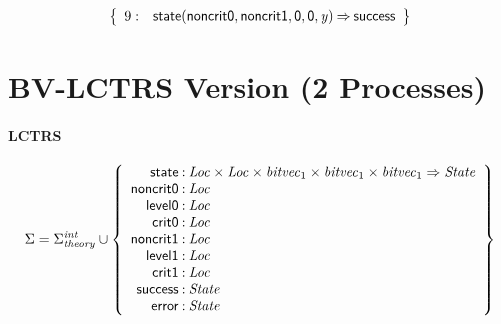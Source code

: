 \documentclass[a4paper]{article}
\newcommand{\Sort}[1]{\mathit{#1}}
\newcommand{\symb}[1]{\mathsf{#1}}
\newcommand{\var}[1]{\mathit{#1}}
\newcommand{\Sigmainttheory}{\Sigma^{\mathit{int}}_{\mathit{theory}}}
\begin{document}
\[
\left\{
\begin{array}{rr@{\>}c@{\>}ll}
\mathrm{9} : 
 & \symb{state}(\symb{noncrit0},\symb{noncrit1},\symb{0},\symb{0},\var{y})
 & \Rightarrow 
 & \symb{success}\\

\end{array}
\right\}
\]

\newpage
\section*{BV-LCTRS Version (2 Processes)}


\paragraph{LCTRS}

\[
\Sigma = 
\Sigmainttheory \cup\left\{
\begin{array}{r@{\>}c@{\>}l}
\symb{state} & : & \Sort{Loc} \times \Sort{Loc} \times \Sort{bitvec}_{1} \times \Sort{bitvec}_{1} \times \Sort{bitvec}_{1} \Rightarrow \Sort{State}\\
\symb{noncrit0} & : & \Sort{Loc}\\
\symb{level0} & : & \Sort{Loc}\\
\symb{crit0} & : & \Sort{Loc}\\
\symb{noncrit1} & : & \Sort{Loc}\\
\symb{level1} & : & \Sort{Loc}\\
\symb{crit1} & : & \Sort{Loc}\\
\symb{success} & : & \Sort{State}\\
\symb{error} & : & \Sort{State}\\
\end{array}
\right\}
\]
\end{document}
